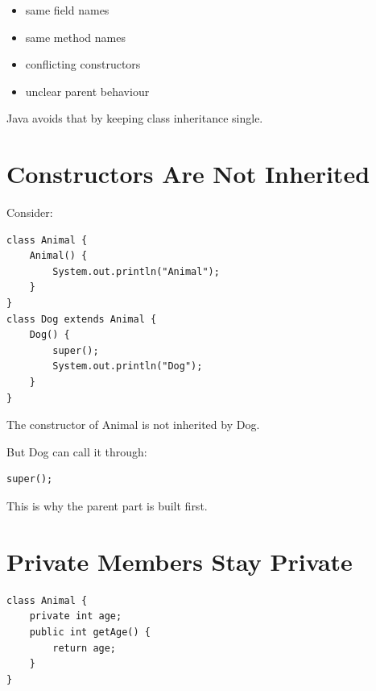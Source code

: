 \documentclass[11pt,a4paper]{book}
\begin{document}
\begin{itemize}
\item same field names
\item same method names
\item conflicting constructors
\item unclear parent behaviour
\end{itemize}


Java avoids that by keeping class inheritance single.


\section{Constructors Are Not Inherited}

Consider:

\begin{verbatim}
class Animal {
    Animal() {
        System.out.println("Animal");
    }
}
class Dog extends Animal {
    Dog() {
        super();
        System.out.println("Dog");
    }
}
\end{verbatim}


The constructor of Animal is not inherited by Dog.

But Dog can call it through:

\begin{verbatim}
super();
\end{verbatim}


This is why the parent part is built first.


\section{Private Members Stay Private}

\begin{verbatim}
class Animal {
    private int age;
    public int getAge() {
        return age;
    }
}
\end{verbatim}

\end{document}
